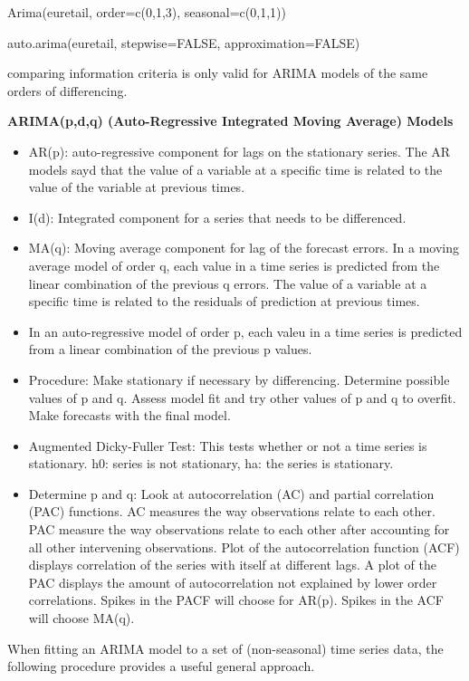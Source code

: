\documentclass[]{book}
\begin{document}
Arima(euretail, order=c(0,1,3), seasonal=c(0,1,1))

auto.arima(euretail, stepwise=FALSE, approximation=FALSE)

comparing information criteria is only valid for ARIMA models of the
same orders of differencing.

\textbf{ARIMA(p,d,q) (Auto-Regressive Integrated Moving Average) Models}

\begin{itemize}
\item
  AR(p): auto-regressive component for lags on the stationary series.
  The AR models sayd that the value of a variable at a specific time is
  related to the value of the variable at previous times.
\item
  I(d): Integrated component for a series that needs to be differenced.
\item
  MA(q): Moving average component for lag of the forecast errors. In a
  moving average model of order q, each value in a time series is
  predicted from the linear combination of the previous q errors. The
  value of a variable at a specific time is related to the residuals of
  prediction at previous times.
\item
  In an auto-regressive model of order p, each valeu in a time series is
  predicted from a linear combination of the previous p values.
\item
  Procedure: Make stationary if necessary by differencing. Determine
  possible values of p and q. Assess model fit and try other values of p
  and q to overfit. Make forecasts with the final model.
\item
  Augmented Dicky-Fuller Test: This tests whether or not a time series
  is stationary. h0: series is not stationary, ha: the series is
  stationary.
\item
  Determine p and q: Look at autocorrelation (AC) and partial
  correlation (PAC) functions. AC measures the way observations relate
  to each other. PAC measure the way observations relate to each other
  after accounting for all other intervening observations. Plot of the
  autocorrelation function (ACF) displays correlation of the series with
  itself at different lags. A plot of the PAC displays the amount of
  autocorrelation not explained by lower order correlations. Spikes in
  the PACF will choose for AR(p). Spikes in the ACF will choose MA(q).
\end{itemize}

When fitting an ARIMA model to a set of (non-seasonal) time series data,
the following procedure provides a useful general approach.
\end{document}

